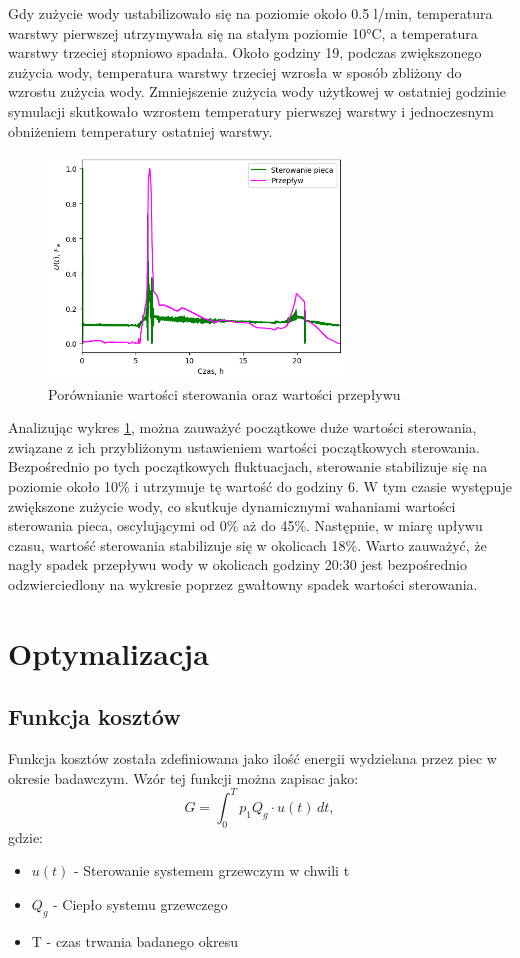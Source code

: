 \documentclass[a4paper,twoside,12pt]{book}
\begin{document}
Gdy zużycie wody ustabilizowało się na poziomie około 0.5 l/min, temperatura warstwy pierwszej utrzymywała się na stałym poziomie 10°C, a temperatura warstwy trzeciej stopniowo spadała. Około godziny 19, podczas zwiększonego zużycia wody, temperatura warstwy trzeciej wzrosła w sposób zbliżony do wzrostu zużycia wody. Zmniejszenie zużycia wody użytkowej w ostatniej godzinie symulacji skutkowało wzrostem temperatury pierwszej warstwy i jednoczesnym obniżeniem temperatury ostatniej warstwy.

\newpage
\begin{figure}[!h]
  \centering
  \includegraphics[width=0.7\textwidth]{img/Sterowanie.png}
  \caption{Porównianie wartości sterowania oraz wartości przepływu}
  \label{fig:porównianie_ster_przep}
\end{figure}
Analizując wykres \ref{fig:porównianie_ster_przep}, można zauważyć początkowe duże wartości sterowania, związane z ich przybliżonym ustawieniem wartości początkowych sterowania. Bezpośrednio po tych początkowych fluktuacjach, sterowanie stabilizuje się na poziomie około 10\% i utrzymuje tę wartość do godziny 6. W tym czasie występuje zwiększone zużycie wody, co skutkuje dynamicznymi wahaniami wartości sterowania pieca, oscylującymi od 0\% aż do 45\%. Następnie, w miarę upływu czasu, wartość sterowania stabilizuje się w okolicach 18\%. Warto zauważyć, że nagły spadek przepływu wody w okolicach godziny 20:30 jest bezpośrednio odzwierciedlony na wykresie poprzez gwałtowny spadek wartości sterowania.

\section{Optymalizacja}
\subsection*{Funkcja kosztów}
Funkcja kosztów została zdefiniowana jako ilość energii wydzielana przez piec w okresie badawczym. Wzór tej funkcji można zapisac jako:
\begin{equation}
  G = \int_{0}^{T} p_1 Q_g \cdot u(t)  \, dt,
\end{equation}
gdzie:
\begin{itemize}
  \item $u(t)$ - Sterowanie systemem grzewczym w chwili t
  \item $Q_g$ - Ciepło systemu grzewczego
  \item T - czas trwania badanego okresu
\end{itemize}
\end{document}
